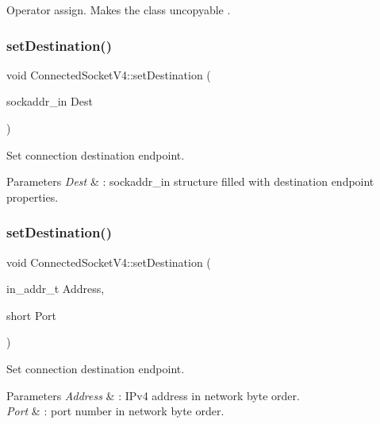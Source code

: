 Operator assign. Makes the class uncopyable . \mbox{\label{classConnectedSocketV4_a550cc6530361565ea80e0b2ce892402e}} 
\subsubsection{\texorpdfstring{set\+Destination()}{setDestination()}\hspace{0.1cm}{\footnotesize\ttfamily [1/3]}}
{\footnotesize\ttfamily void Connected\+Socket\+V4\+::set\+Destination (\begin{DoxyParamCaption}\item[{sockaddr\+\_\+in}]{Dest }\end{DoxyParamCaption})\hspace{0.3cm}{\ttfamily [inline]}}

Set connection destination endpoint. 
\begin{DoxyParams}{Parameters}
{\em Dest} & \+: sockaddr\+\_\+in structure filled with destination endpoint properties. \\
\hline
\end{DoxyParams}
\mbox{\label{classConnectedSocketV4_a8f069939a6796530ba9f2a781e787db7}} 
\subsubsection{\texorpdfstring{set\+Destination()}{setDestination()}\hspace{0.1cm}{\footnotesize\ttfamily [2/3]}}
{\footnotesize\ttfamily void Connected\+Socket\+V4\+::set\+Destination (\begin{DoxyParamCaption}\item[{in\+\_\+addr\+\_\+t}]{Address,  }\item[{short}]{Port }\end{DoxyParamCaption})}

Set connection destination endpoint. 
\begin{DoxyParams}{Parameters}
{\em Address} & \+: I\+Pv4 address in network byte order. \\
\hline
{\em Port} & \+: port number in network byte order. \\
\hline
\end{DoxyParams}
\mbox{\label{classConnectedSocketV4_a9ba0783ad8bdeabd25a1ba5a2a1178fc}} 
